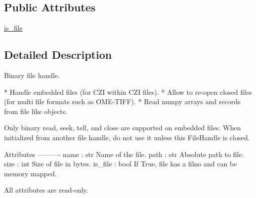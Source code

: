\subsection*{Public Attributes}
\begin{DoxyCompactItemize}
\item 
\hyperlink{classtifffile_1_1_file_handle_a965cb7fae14d9f259b2197072da2cf2e}{is\-\_\-file}
\end{DoxyCompactItemize}


\subsection{Detailed Description}
\begin{DoxyVerb}Binary file handle.

* Handle embedded files (for CZI within CZI files).
* Allow to re-open closed files (for multi file formats such as OME-TIFF).
* Read numpy arrays and records from file like objects.

Only binary read, seek, tell, and close are supported on embedded files.
When initialized from another file handle, do not use it unless this
FileHandle is closed.

Attributes
----------
name : str
    Name of the file.
path : str
    Absolute path to file.
size : int
    Size of file in bytes.
is_file : bool
    If True, file has a filno and can be memory mapped.

All attributes are read-only.\end{DoxyVerb}
 

